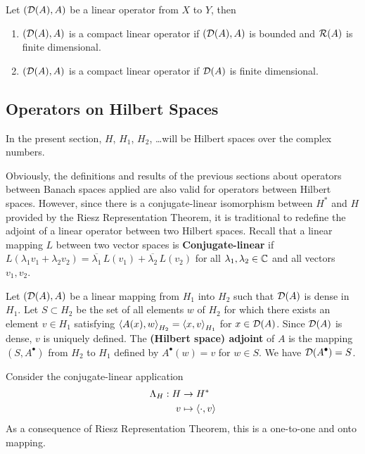 \begin{theorem}
Let $(\mathcal{D}(A),A)$ be a linear operator from $X$ to $Y$, then
\begin{enumerate}
\item $(\mathcal{D}(A),A)$ is a compact linear operator if $(\mathcal{D}(A),A)$ is
bounded and $\mathcal{R}(A)$ is finite dimensional.
\item $(\mathcal{D}(A),A)$ is a compact linear operator if $\mathcal{D}(A)$ is finite
dimensional.
\end{enumerate}
\end{theorem}

\subsection{Operators on Hilbert Spaces}

In the present section, $H$, $H_1$, $H_2$, \ldots will be Hilbert
spaces over the complex numbers.

Obviously, the definitions and results of the previous
sections about operators between Banach spaces applied are also valid
for operators between Hilbert spaces.
However, since there is a conjugate-linear isomorphism between
$\displaystyle H^\ast$ and $H$ provided by the Riesz Representation
Theorem, it is traditional to redefine the adjoint of a linear
operator between two Hilbert spaces.  Recall that a linear mapping $L$
between two vector spaces is
{\bfseries Conjugate-linear}
if $L(\lambda_1v_1 + \lambda_2 v_2) = \overline{\lambda_1}\, L(v_1)
+ \overline{\lambda_2}\, L(v_2)$ for all $\lambda_1, \lambda_2 \in \mathbb{C}$ and
all vectors $v_1,v_2$.

\begin{defn} \label{fu_an_dualHB_def}
Let $(\mathcal{D}(A),A)$ be a linear mapping from $H_1$ into $H_2$ such that
$\mathcal{D}(A)$ is dense in $H_1$.  Let $S \subset H_2$ be the set of all
elements $w$ of $H_2$ for which there exists an element $v \in H_1$
satisfying $\displaystyle \left\langle{A(x)} , {w}\right\rangle_{H_2} = \left\langle{x} , {v}\right\rangle_{H_1}$ for $x
\in \mathcal{D}(A)$.  Since $\mathcal{D}(A)$ is dense, $v$ is uniquely defined.  The
{\bfseries (Hilbert space) adjoint} of $A$ is the mapping $\displaystyle (S,A^\bullet)$ from
$H_2$ to $H_1$ defined by $\displaystyle A^\bullet(w) = v$ for $w\in S$.
We have $\displaystyle \mathcal{D}(A^\bullet) = S$.
\end{defn}

Consider the conjugate-linear application
\begin{align*}
\Lambda_H : H &\rightarrow H^\ast \\
v & \mapsto  \left\langle{\cdot} , {v}\right\rangle
\end{align*}
As a consequence of Riesz Representation Theorem, this is a one-to-one
and onto mapping.

